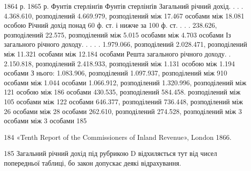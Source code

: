                                                            1864 р.                             1865
р.
                                                          Фунтів стерлінґів          Фунтів
стерлінґів
Загальний річний дохід. . . .   4.368.610, розподілений          4.669.979, розподілений
                                                            між 17.467 особами                між
18.081 особою
Річний дохід понад
60 ф. ст. і нижче
за 100 ф. ст. . . .                 238.626, розподілений                             22.575,
розподілений
                                                          між 5.015 особами                         
            між 4.703 особами
Із загального річного
доходу. . . . .             1.979.066, розподілений                            2.028.471,
розподілений
                                                 між 11.321 особами                                 
     між 12.184 особами
Решта загального
річного доходу. .    2.150.818, розподілений                          2.418.933, розподілений
                                         між 1.131 особою                                           
між 1.194 особами
З нього: 1.083.906, розподілений                        1.097.937, розподілений
                                              між 910 особами                                      
між 1.044 особами
                                       1.066.912, розподілений                         1.320.996,
розподілений
                                           між 121 особою                                           
      між 186 особами
                                         430.535, розподілений                              
584.458. розподілений
                                                  між 105 особами                                   
         між 122 особами
                                          646.377, розподілений                             
736.448, розподілений
                                                   між 26 особами                                   
         між 28 особами
                                          262.610, розподілений                             274.528,
розподілений
                                                  між 3 особами                                     
            між 3 особами 185

184 «Tenth Report of the Commissioners of Inland Revenue», London
1866.

185    Загальний річний дохід під рубрикою D відхиляється тут від
чисел попередньої таблиці, бо закон допускає деякі відрахування.
